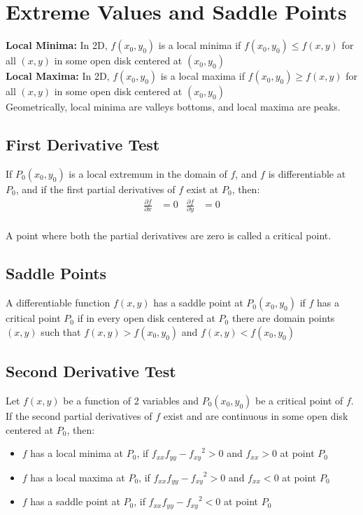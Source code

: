 \documentclass{article}
\begin{document}
\section{Extreme Values and Saddle Points}
\textbf{Local Minima: } In 2D, $f(x_0, y_0)$ is a local minima if $f(x_0, y_0) \leq f(x,y)$ for all $(x,y)$ in some open disk centered at $(x_0, y_0)$\\
\textbf{Local Maxima: } In 2D, $f(x_0, y_0)$ is a local maxima if $f(x_0, y_0) \geq  f(x,y)$ for all $(x,y)$ in some open disk centered at $(x_0, y_0)$\\
Geometrically, local minima are valleys bottoms, and local maxima are peaks.

\subsection{First Derivative Test}
If $P_0(x_0, y_0)$ is a local extremum in the domain of $f$, and $f$ is differentiable at $P_0$, and if the first partial derivatives of $f$ exist at $P_0$, then:
\begin{align*}
\frac{\partial f}{\partial x} &= 0  & \frac{\partial f}{\partial y} &= 0 \\
\end{align*}

A point where both the partial derivatives are zero is called a critical point.

\subsection{Saddle Points}
A differentiable function $f(x,y)$ has a saddle point at $P_0(x_0, y_0)$ if $f$ has a critical point $P_0$ if in every open disk centered at $P_0$ there are domain points $(x,y)$ such that $f(x,y) > f(x_0, y_0)$ and $f(x,y) < f(x_0, y_0)$

\subsection{Second Derivative Test}
Let $f(x,y)$ be a function of 2 variables and $P_0(x_0, y_0)$ be a critical point of $f$. If the second partial derivatives of $f$ exist and are continuous in some open disk centered at $P_0$, then:
\begin{itemize}
    \item $f$ has a local minima at $P_0$,  if $f_{xx} f_{yy} - {f_{xy}}^2 > 0$ and $f_{xx} > 0$ at point $P_0$
    \item $f$ has a local maxima at $P_0$,  if $f_{xx} f_{yy} - {f_{xy}}^2 > 0$ and $f_{xx} < 0$ at point $P_0$
    \item $f$ has a saddle point at $P_0$,  if $f_{xx} f_{yy} - {f_{xy}}^2 < 0$ at point $P_0$
\end{itemize}
\end{document}
